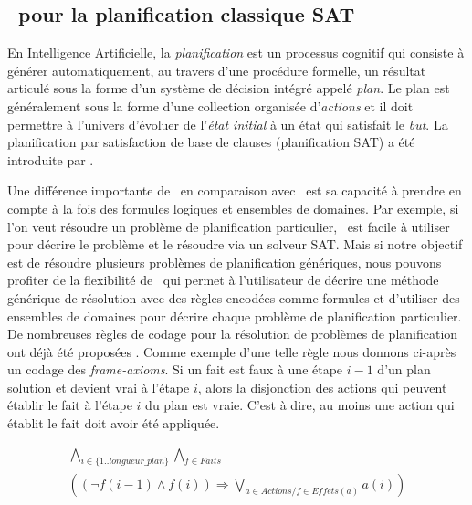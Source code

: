 
\subsection{\nameTool\ pour la planification classique SAT}

En Intelligence Artificielle, la \emph{planification} est un processus cognitif qui consiste \`a g\'en\'erer automatiquement, au travers d'une proc\'edure formelle, un r\'esultat articul\'e sous la forme d'un syst\`eme de d\'ecision int\'egr\'e appel\'e \emph{plan}. Le plan est g\'en\'eralement sous la forme d'une collection organis\'ee d'\emph{actions} et il doit permettre \`a l'univers d'\'evoluer de l'\emph{\'etat initial} \`a un \'etat qui satisfait le \emph{but}.
La planification par satisfaction de base de clauses (planification SAT) a \'et\'e introduite par \cite{kautzS92_planning_sat}.

Une diff\'erence importante de \nameTool\, en comparaison avec \satoulouse\, est sa capacit\'e \`a prendre en compte \`a la fois des formules logiques et ensembles de domaines. Par exemple, si l'on veut r\'esoudre un probl\`eme de planification particulier, \satoulouse\ est facile \`a utiliser pour d\'ecrire le probl\`eme et le r\'esoudre via un solveur SAT. Mais si notre objectif est de r\'esoudre plusieurs probl\`emes de planification g\'en\'eriques, nous pouvons profiter de la flexibilit\'e de \nameTool\ qui permet \`a l'utilisateur de d\'ecrire une m\'ethode g\'en\'erique de r\'esolution avec des r\`egles encod\'ees comme formules et d'utiliser des ensembles de domaines pour d\'ecrire chaque probl\`eme de planification particulier. De nombreuses r\`egles de codage pour la r\'esolution de probl\`emes de planification ont d\'ej\`a \'et\'e propos\'ees \cite{kautzS92_planning_sat} \cite{MaliK99_plan_space_encodings}. Comme exemple d'une telle r\`egle nous donnons ci-apr\`es un codage des \emph{frame-axioms}. Si un fait est faux \`a une \'etape $i-1$ d'un plan solution et devient vrai \`a l'\'etape $i$, alors la disjonction des actions qui peuvent \'etablir le fait \`a l'\'etape $i$ du plan est vraie. C'est \`a dire, au moins une action qui \'etablit le fait doit avoir \'et\'e appliqu\'ee.


  \[\begin{aligned}\bigwedge_{i\in\{1..longueur\_plan\}}
  \bigwedge_{f\in Faits} \hspace{4cm}\\
  \left((\lnot f(i-1) \wedge f(i)) \Rightarrow 
  \bigvee_{a\in Actions / f\in Effets(a)} a(i)\right)\end{aligned}\]
\\


